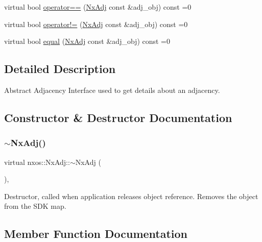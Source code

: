 \begin{DoxyCompactItemize}
\item 
virtual bool \mbox{\hyperlink{classnxos_1_1_nx_adj_a19eea20ba216dd722d783bbb0982814e}{operator==}} (\mbox{\hyperlink{classnxos_1_1_nx_adj}{Nx\+Adj}} const \&adj\+\_\+obj) const =0
\item 
virtual bool \mbox{\hyperlink{classnxos_1_1_nx_adj_a17e77aa58ac0b094a766dbd4d805bfe2}{operator!=}} (\mbox{\hyperlink{classnxos_1_1_nx_adj}{Nx\+Adj}} const \&adj\+\_\+obj) const =0
\item 
virtual bool \mbox{\hyperlink{classnxos_1_1_nx_adj_ac734e9f8f4bbacea1bfdd4d28b7a72d2}{equal}} (\mbox{\hyperlink{classnxos_1_1_nx_adj}{Nx\+Adj}} const \&adj\+\_\+obj) const =0
\end{DoxyCompactItemize}


\subsection{Detailed Description}
Abstract Adjacency Interface used to get details about an adjacency. 

\subsection{Constructor \& Destructor Documentation}
\mbox{\label{classnxos_1_1_nx_adj_a308082669b2c45fe0bc3ae8ceedacdb6}} 
\subsubsection{\texorpdfstring{$\sim$\+Nx\+Adj()}{~NxAdj()}}
{\footnotesize\ttfamily virtual nxos\+::\+Nx\+Adj\+::$\sim$\+Nx\+Adj (\begin{DoxyParamCaption}{ }\end{DoxyParamCaption})\hspace{0.3cm}{\ttfamily [inline]}, {\ttfamily [virtual]}}

Destructor, called when application releases object reference. Removes the object from the S\+DK map. 

\subsection{Member Function Documentation}
\mbox{\label{classnxos_1_1_nx_adj_ac734e9f8f4bbacea1bfdd4d28b7a72d2}} 
